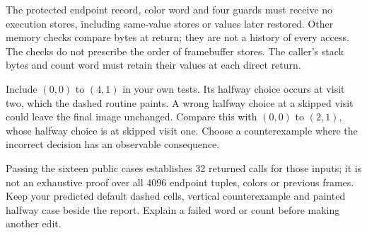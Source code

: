 The protected endpoint record, color word and four guards must receive no
execution stores, including same-value stores or values later restored. Other
memory checks compare bytes at return; they are not a history of every access.
The checks do not prescribe the order of framebuffer stores. The caller's stack
bytes and count word must retain their values at each direct return.

Include $(0,0)$ to $(4,1)$ in your own tests. Its halfway choice occurs at visit
two, which the dashed routine paints. A wrong halfway choice at a skipped visit
could leave the final image unchanged. Compare this with $(0,0)$ to $(2,1)$,
whose halfway choice is at skipped visit one. Choose a counterexample where the
incorrect decision has an observable consequence.

Passing the sixteen public cases establishes 32 returned calls for those inputs;
it is not an exhaustive proof over all 4096 endpoint tuples, colors or previous
frames. Keep your predicted default dashed cells, vertical counterexample and
painted halfway case beside the report. Explain a failed word or count before
making another edit.
